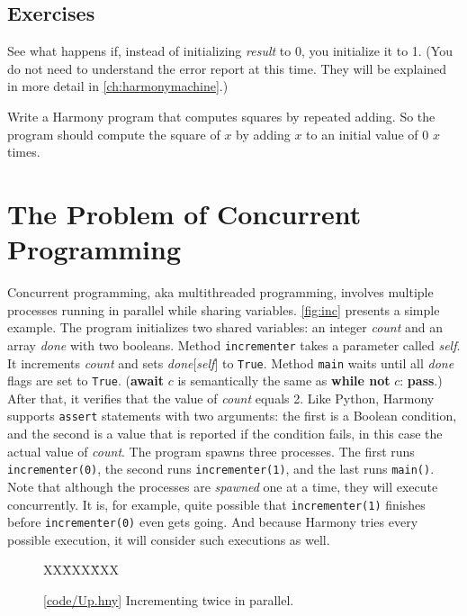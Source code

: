 \documentclass{report}
\newcommand{\harmonysource}[1]{
\begin{tabbing}
XX\=XXX\=XXX\kill
    
\end{tabbing}
}
\newcommand{\harmonylink}[1]{%
[\href{https://www.cs.cornell.edu/home/rvr/harmony/#1}{\underline{#1}}]%
}
\newenvironment{code}{
\tcolorbox
}{
\endtcolorbox
}
\begin{document}
\section*{Exercises}
\begin{problems}
\item See what happens if, instead of initializing \textit{result} to 0,
you initialize it to 1.  (You do not need to understand the error report at this time.  They will be explained in more detail in \autoref{ch:harmonymachine}.)
\item Write a Harmony program that computes squares by repeated adding.  So the program
should compute the square of $x$ by adding $x$ to an initial value of 0 $x$ times.
\end{problems}

\chapter{The Problem of Concurrent Programming}
\label{ch:concurrent}

%

Concurrent programming, aka multithreaded programming, involves multiple
processes
%
running in parallel while sharing variables.
\autoref{fig:inc} presents a simple example.
The program
initializes two shared variables: an integer \textit{count} and
an array \textit{done} with two booleans.
Method \texttt{incrementer} takes a parameter called \textit{self}.
It increments \textit{count} and sets \textit{done}[\textit{self}] to \texttt{True}.
Method \texttt{main} waits until all \textit{done} flags are set to \texttt{True}.
(\textbf{await} $c$ is semantically the same as \textbf{while not} $c$: \textbf{pass}.)
After that, it verifies that the value of \textit{count} equals 2.
Like Python, Harmony supports \texttt{assert} statements with two arguments:
the first is a Boolean condition, and the second is a value that is
reported if the condition fails, in this case
the actual value of \textit{count}.
The program spawns three processes.
The first runs \texttt{incrementer(0)}, the second runs
\texttt{incrementer(1)}, and the last runs \texttt{main()}.
Note that although the processes are \emph{spawned} one at a time,
they will execute concurrently.  It is, for example, quite possible
that \texttt{incrementer(1)} finishes before \texttt{incrementer(0)}
even gets going.
And because Harmony tries every possible execution, it will consider
such executions as well.

\begin{figure}[h]
\begin{code}
\harmonysource{Up}
\end{code}
\caption{\harmonylink{code/Up.hny} Incrementing twice in parallel.}
\label{fig:inc}
\end{figure}
\end{document}

